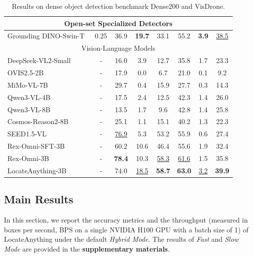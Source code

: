 \documentclass{llmxive}
\begin{document}
\begin{table}[t]
{\begin{tabular}{l|c|ccc|ccc}
            \multicolumn{8}{c}{{Open-set Specialized Detectors}} \\
            \midrule
            Grounding DINO-Swin-T~\citep{liu2023grounding} & 0.25 & 36.9 & \textbf{19.7} & 33.1 & 55.2 & \textbf{3.9} & \underline{38.5} \\
            \midrule

            \multicolumn{8}{c}{{Vision-Language Models}} \\
            \midrule
            DeepSeek-VL2-Small~\citep{wu2024deepseekvl2mixtureofexpertsvisionlanguagemodels} & - & 16.0 & 3.9 & 12.7 & 35.8 & 1.7 & 23.3 \\
            OVIS2.5-2B~\citep{lu2025ovis25technicalreport}         & - & 17.9 & 0.0 & 6.7 & 21.0 & 0.1 & 9.2 \\
            MiMo-VL-7B~\citep{coreteam2025mimovltechnicalreport}         & - & 29.7 & 0.4 & 15.9 & 27.7 & 0.3 & 14.3 \\
            Qwen3-VL-4B~\citep{bai2025qwen3vltechnicalreport}        & - & 17.5 & 2.4 & 12.5 & 42.3 & 1.4 & 26.0 \\
            Qwen3-VL-8B~\citep{bai2025qwen3vltechnicalreport}        & - & 13.5 & 1.7 & 9.6  & 42.8 & 1.4 & 25.8 \\
            Cosmos-Reason2-8B~\citep{cosmosreason2}        & - & 25.1 & 1.1 & 15.1 & 40.2 & 1.3 & 22.3 \\
            SEED1.5-VL~\citep{guo2025seed15vltechnicalreport}         & - & \underline{76.9} & 5.3 & 53.2 & 55.9 & 0.6 & 27.4 \\
            Rex-Omni-SFT-3B~\citep{jiang2025rexomni}       & - & 60.2 & 10.6 & 46.4 & 55.6 & 1.9 & 32.4 \\
            Rex-Omni-3B~\citep{jiang2025rexomni}           & - & \textbf{78.4} & 10.3 & \underline{58.3} & \underline{61.6} & 1.5 & 35.8 \\
            \rowcolor{lightblue!10}
            LocateAnything-3B     & - & 74.0 & \underline{18.5} & \textbf{58.7} & \textbf{63.0} & \underline{3.2} & \textbf{39.9} \\
            \bottomrule
        \end{tabular}
    }
    \label{tab:dense_object_detection}
\caption{Results on dense object detection benchmark Dense200 and VisDrone. }
\end{table}

\vspace{-2mm}
\subsection{Main Results}
In this section, we report the accuracy metrics and the throughput (measured in boxes per second, BPS on a single NVIDIA H100 GPU with a batch size of 1) of LocateAnything under the default \textit{Hybrid Mode}. The results of \textit{Fast} and \textit{Slow Mode} are provided in the \textbf{supplementary materials}.
\end{document}
